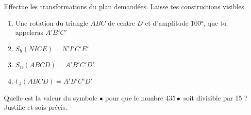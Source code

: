 \documentclass[parskip=half-,twoside=semi, 12pt]{scrartcl}
\begin{document}
\begin{solappliquer}
    Effectue les transformations du plan demandées. Laisse tes constructions visibles.
    \begin{enumerate}
        \item Une rotation du triangle \(ABC\) de centre \(D\) et d'amplitude \ang{100}, que tu appeleras \(A'B'C'\)
              \begin{center}
                  
              \end{center}
        \item \(S_{h}(NICE) = N'I'C'E'\)
              \begin{center}
                  
              \end{center}
        \item \(S_{O}(ABCD)=A'B'C'D'\)
              \begin{center}
                  
              \end{center}
        \item \(t_{\overrightarrow{v}}(ABCD)=A'B'C'D'\)
              \begin{center}
                  
              \end{center}
    \end{enumerate}
\end{solappliquer}
\newpage
\begin{transferer}[points=3]
    Quelle est la valeur du symbole \(\bullet\) pour que le nombre \(435\bullet\) soit divisible par 15 ? Justifie et sois précis.
    \vfill
\end{transferer}
\end{document}
